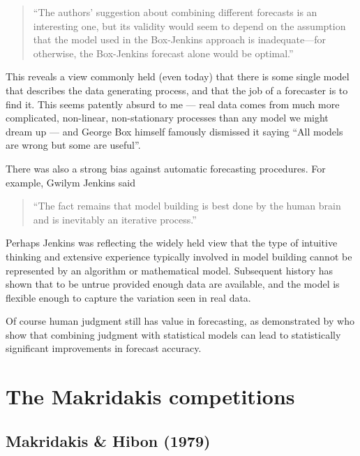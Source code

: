 \documentclass[11pt,a4paper,]{article}
\begin{document}
\begin{quote}
``The authors' suggestion about combining different forecasts is an interesting one, but its validity would seem to depend on the assumption that the model used in the Box-Jenkins approach is inadequate---for otherwise, the Box-Jenkins forecast alone would be optimal.''
\end{quote}

This reveals a view commonly held (even today) that there is some single model that describes the data generating process, and that the job of a forecaster is to find it. This seems patently absurd to me --- real data comes from much more complicated, non-linear, non-stationary processes than any model we might dream up --- and George Box himself famously dismissed it saying ``All models are wrong but some are useful''.

There was also a strong bias against automatic forecasting procedures. For example, Gwilym Jenkins said

\begin{quote}
``The fact remains that model building is best done by the human brain and is inevitably an iterative process.''
\end{quote}

Perhaps Jenkins was reflecting the widely held view that the type of intuitive thinking and extensive experience typically involved in model building cannot be represented by an algorithm or mathematical model. Subsequent history has shown that to be untrue provided enough data are available, and the model is flexible enough to capture the variation seen in real data.

Of course human judgment still has value in forecasting, as demonstrated by \textcite{Petropoulos2018} who show that combining judgment with statistical models can lead to statistically significant improvements in forecast accuracy.

\hypertarget{sec:makridakis}{%
\section{The Makridakis competitions}\label{sec:makridakis}}

\hypertarget{makridakis-hibon-1979}{%
\subsection*{Makridakis \& Hibon (1979)}\label{makridakis-hibon-1979}}
\end{document}
